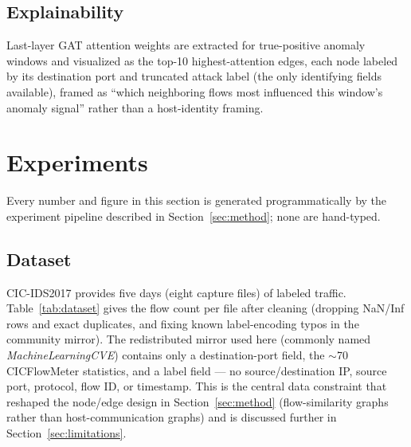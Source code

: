 \documentclass[twocolumn]{llncs}
\begin{document}
\subsection{Explainability}
Last-layer GAT attention weights are extracted for true-positive anomaly windows and visualized as
the top-10 highest-attention edges, each node labeled by its destination port and truncated attack
label (the only identifying fields available), framed as ``which neighboring flows most influenced
this window's anomaly signal'' rather than a host-identity framing.

\section{Experiments}
\label{sec:experiments}

Every number and figure in this section is generated programmatically by the experiment pipeline
described in Section~\ref{sec:method}; none are hand-typed.

\subsection{Dataset}
\label{sec:data}

CIC-IDS2017 \cite{sharafaldin2018cicids2017} provides five days (eight capture files) of labeled
traffic. Table~\ref{tab:dataset} gives the flow count per file after cleaning (dropping NaN/Inf
rows and exact duplicates, and fixing known label-encoding typos in the community mirror). The
redistributed mirror used here (commonly named \emph{MachineLearningCVE}) contains only a
destination-port field, the $\sim$70 CICFlowMeter statistics, and a label field --- no
source/destination IP, source port, protocol, flow ID, or timestamp. This is the central data
constraint that reshaped the node/edge design in Section~\ref{sec:method} (flow-similarity graphs
rather than host-communication graphs) and is discussed further in Section~\ref{sec:limitations}.
\end{document}
